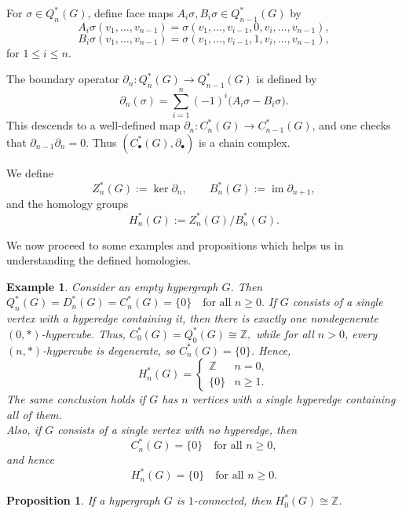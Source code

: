 \documentclass[10pt,a4paper]{amsart}
\newtheorem{ex}[subsection]{Example}
\newtheorem{prop}[subsection]{Proposition}
\begin{document}
For $\sigma \in Q_n^*(G)$, define face maps $A_i\sigma, B_i\sigma \in Q_{n-1}^*(G)$ by
\[
A_i\sigma(v_1,\dots,v_{n-1}) = \sigma(v_1,\dots,v_{i-1},0,v_i,\dots,v_{n-1}),
\]
\[
B_i\sigma(v_1,\dots,v_{n-1}) = \sigma(v_1,\dots,v_{i-1},1,v_i,\dots,v_{n-1}),
\]
for $1 \leq i \leq n$.

The boundary operator $\partial_n \colon Q_n^*(G) \to Q_{n-1}^*(G)$ is defined by
\[
\partial_n(\sigma) = \sum_{i=1}^n (-1)^i \big(A_i\sigma - B_i\sigma\big).
\]
This descends to a well-defined map $\partial_n \colon C_n^*(G) \to C_{n-1}^*(G)$, and one checks that $\partial_{n-1}\partial_n = 0$. Thus $(C_\bullet^*(G), \partial_\bullet)$ is a chain complex.

We define
\[
Z_n^*(G) := \ker \partial_n, \qquad B_n^*(G) := \operatorname{im} \partial_{n+1},
\]
and the homology groups
\[
H_n^*(G) := Z_n^*(G)/B_n^*(G).
\]

We now proceed to some examples and propositions which helps us in understanding the defined homologies.


\begin{ex}\label{eg single point hom} Consider an empty hypergraph $G$. Then 
$
Q_n^*(G)=D_n^*(G)=C_n^*(G)=\{0\} \quad \text{for all } n \geq 0.
$
If $G$ consists of a single vertex with a hyperedge containing it, then there is exactly one nondegenerate $(0,*)$-hypercube. Thus,
$
C_0^*(G)=Q_0^*(G)\cong \mathbb{Z},
$
while for all $n>0$, every $(n,*)$-hypercube is degenerate, so $C_n^*(G)=\{0\}$. Hence,
\[
H_n^*(G)=
\begin{cases}
\mathbb{Z} & n=0,\\
\{0\} & n \geq 1.
\end{cases}
\]
The same conclusion holds if $G$ has $n$ vertices with a single hyperedge containing all of them.
\\
Also, if $G$ consists of a single vertex with no hyperedge, then 
\[
C_n^*(G)=\{0\} \quad \text{for all } n \geq 0,
\]
and hence 
\[
H_n^*(G)=\{0\} \quad \text{for all } n \geq 0.
\]
\end{ex}


\begin{prop}\label{prop 1-connected}
	If a hypergraph $G$ is $1$-connected, then $H_0^*(G)\cong \mathbb{Z}$.
\end{prop}
\end{document}
